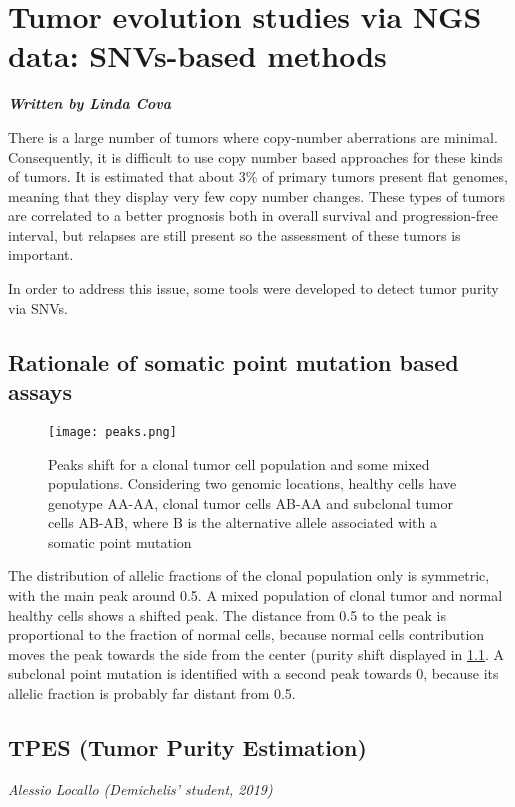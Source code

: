 \graphicspath{{chapters/TumorEvolution3Images/}}

\chapter{Tumor evolution studies via NGS data: SNVs-based methods}

\textbf{\textit{Written by Linda Cova}}

There is a large number of tumors where copy-number aberrations are minimal.
Consequently, it is difficult to use copy number based approaches for these
kinds of tumors. It is estimated that about 3\% of primary tumors present flat
genomes, meaning that they display very few copy number changes. These types of
tumors are correlated to a better prognosis both in overall survival and
progression-free interval, but relapses are still present so the assessment of
these tumors is important.

In order to address this issue, some tools were developed to detect tumor purity
via SNVs.

\section{Rationale of somatic point mutation based assays}

\begin{figure}[H]
    \texttt{[image: peaks.png]}
    \caption{\label{fig:peaks}Peaks shift for a clonal tumor cell population and
    some mixed populations. Considering two genomic locations, healthy cells
    have genotype AA-AA, clonal tumor cells AB-AA and subclonal tumor cells
    AB-AB, where B is the alternative allele associated with a somatic point
    mutation}
\end{figure}

The distribution of allelic fractions of the clonal population only is
symmetric, with the main peak around 0.5. A mixed population of clonal tumor and
normal healthy cells shows a shifted peak. The distance from 0.5 to the peak is
proportional to the fraction of normal cells, because normal cells contribution
moves the peak towards the side from the center (purity shift displayed in
\ref{fig:peaks}. A subclonal point mutation is identified with a second peak
towards 0, because its allelic fraction is probably far distant from 0.5.

\section{TPES (Tumor Purity Estimation)}
\textit{Alessio Locallo (Demichelis' student, 2019)}\\

